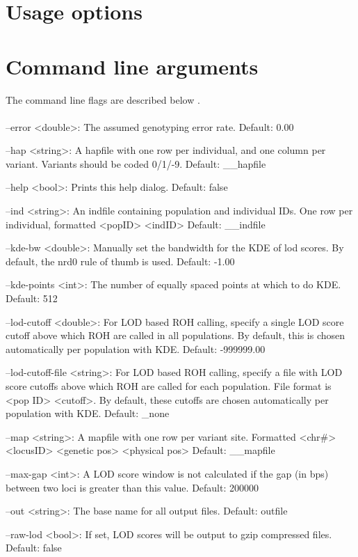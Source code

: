 \documentclass[titlepage,12pt] {article}
\begin{document}
\section{Usage options}
\label{sec:use}


\section{Command line arguments}
\label{sec:cmdline}
The command line flags are described below . 
\\
\\
--error <double>: The assumed genotyping error rate.
	Default: 0.00

--hap <string>: A hapfile with one row per individual,
	and one column per variant.
	Variants should be coded 0/1/-9.
	Default: __hapfile

--help <bool>: Prints this help dialog.
	Default: false

--ind <string>: An indfile containing population and individual IDs.
	One row per individual, formatted <popID> <indID>
	Default: __indfile

--kde-bw <double>: Manually set the bandwidth for the KDE of lod scores.
	By default, the nrd0 rule of thumb is used.
	Default: -1.00

--kde-points <int>: The number of equally spaced points at which to do KDE.
	Default: 512

--lod-cutoff <double>: For LOD based ROH calling, specify a single LOD score cutoff
	above which ROH are called in all populations.  By default, this is chosen
	automatically per population with KDE.
	Default: -999999.00

--lod-cutoff-file <string>: For LOD based ROH calling, specify a file with LOD score cutoffs
	above which ROH are called for each population.
	File format is <pop ID> <cutoff>.
	By default, these cutoffs are chosen automatically per population with KDE.
	Default: _none

--map <string>: A mapfile with one row per variant site.
	Formatted <chr#> <locusID> <genetic pos> <physical pos>
	Default: __mapfile

--max-gap <int>: A LOD score window is not calculated if the gap (in bps)
	between two loci is greater than this value.
	Default: 200000

--out <string>: The base name for all output files.
	Default: outfile

--raw-lod <bool>: If set, LOD scores will be output to gzip compressed files.
	Default: false
\end{document}
